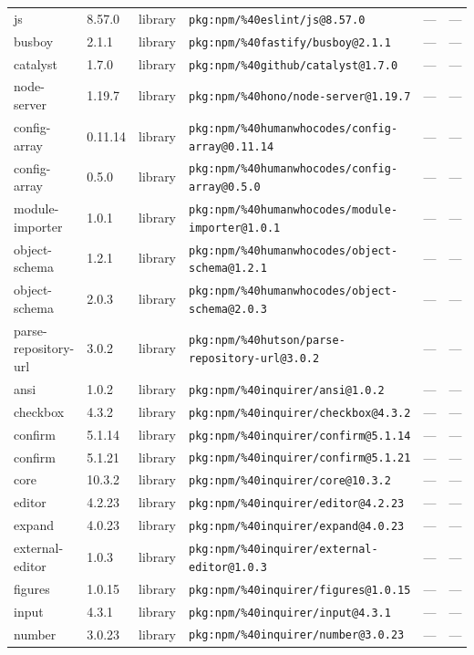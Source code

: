 \documentclass[11pt]{article}
\begin{document}
\begin{longtable}{|l|l|l|p{2.2cm}|l|p{4cm}|}
js & 8.57.0 & library & \texttt{pkg:npm/\%40eslint/js@8.57.0} & — & — \\
busboy & 2.1.1 & library & \texttt{pkg:npm/\%40fastify/busboy@2.1.1} & — & — \\
catalyst & 1.7.0 & library & \texttt{pkg:npm/\%40github/catalyst@1.7.0} & — & — \\
node-server & 1.19.7 & library & \texttt{pkg:npm/\%40hono/node-server@1.19.7} & — & — \\
config-array & 0.11.14 & library & \texttt{pkg:npm/\%40humanwhocodes/config-array@0.11.14} & — & — \\
config-array & 0.5.0 & library & \texttt{pkg:npm/\%40humanwhocodes/config-array@0.5.0} & — & — \\
module-importer & 1.0.1 & library & \texttt{pkg:npm/\%40humanwhocodes/module-importer@1.0.1} & — & — \\
object-schema & 1.2.1 & library & \texttt{pkg:npm/\%40humanwhocodes/object-schema@1.2.1} & — & — \\
object-schema & 2.0.3 & library & \texttt{pkg:npm/\%40humanwhocodes/object-schema@2.0.3} & — & — \\
parse-repository-url & 3.0.2 & library & \texttt{pkg:npm/\%40hutson/parse-repository-url@3.0.2} & — & — \\
ansi & 1.0.2 & library & \texttt{pkg:npm/\%40inquirer/ansi@1.0.2} & — & — \\
checkbox & 4.3.2 & library & \texttt{pkg:npm/\%40inquirer/checkbox@4.3.2} & — & — \\
confirm & 5.1.14 & library & \texttt{pkg:npm/\%40inquirer/confirm@5.1.14} & — & — \\
confirm & 5.1.21 & library & \texttt{pkg:npm/\%40inquirer/confirm@5.1.21} & — & — \\
core & 10.3.2 & library & \texttt{pkg:npm/\%40inquirer/core@10.3.2} & — & — \\
editor & 4.2.23 & library & \texttt{pkg:npm/\%40inquirer/editor@4.2.23} & — & — \\
expand & 4.0.23 & library & \texttt{pkg:npm/\%40inquirer/expand@4.0.23} & — & — \\
external-editor & 1.0.3 & library & \texttt{pkg:npm/\%40inquirer/external-editor@1.0.3} & — & — \\
figures & 1.0.15 & library & \texttt{pkg:npm/\%40inquirer/figures@1.0.15} & — & — \\
input & 4.3.1 & library & \texttt{pkg:npm/\%40inquirer/input@4.3.1} & — & — \\
number & 3.0.23 & library & \texttt{pkg:npm/\%40inquirer/number@3.0.23} & — & — \\

\end{longtable}
\end{document}
